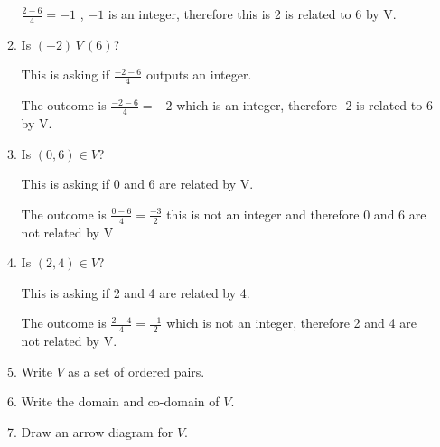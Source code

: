 \documentclass[12pt]{article}
\begin{document}
\begin{enumerate}
\begin{enumerate}
		            \(\frac{2-6}{4} = -1\) , \(-1\) is an integer,
		            therefore this is 2 is related to 6 by V.
		      \item Is \( (-2) \, V \, (6) \)?
		            
		            This is asking if \(\frac{-2-6}{4}\) outputs an
		            integer.
		            
		            The outcome is \(\frac{-2-6}{4} = -2\) which is
		            an integer, therefore -2 is related to 6 by V.
		      \item Is \( (0, 6) \in V \)?
		            
		            This is asking if 0 and 6 are related by V.
		            
		            The outcome is \(\frac{0-6}{4} = \frac{-3}{2}\)
		            this is not an integer and therefore 0 and 6 are
		            not related by V
		            
		      \item Is \( (2, 4) \in V \)?
		            
		            This is asking if 2 and 4 are related by 4.
		            
		            The outcome is \(\frac{2-4}{4} = \frac{-1}{2}\) which is
		            not an integer, therefore 2 and 4 are not related by V.
		      \item Write \( V \) as a set of ordered pairs.
		            
		            
		            \vspace{5cm}
		            
		            
		            
		      \item Write the domain and co-domain of \( V \).
		            
		            \vspace{5cm}
		            
		            
		      \item Draw an arrow diagram for \( V \).
		            \vspace{5cm}
		            
		            
		            

\end{enumerate}
\end{enumerate}
\end{document}
